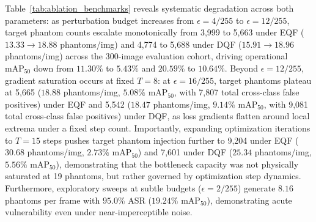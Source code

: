 \documentclass[preprint,12pt]{elsarticle}
\begin{document}
Table~\ref{tab:ablation_benchmarks} reveals systematic degradation across both parameters: as perturbation budget increases from $\epsilon=4/255$ to $\epsilon=12/255$, target phantom counts escalate monotonically from 3,999 to 5,663 under EQF ($13.33 \to 18.88$ phantoms/img) and 4,774 to 5,688 under DQF ($15.91 \to 18.96$ phantoms/img) across the 300-image evaluation cohort, driving operational $\mathrm{mAP}_{50}$ down from $11.30\%$ to $5.43\%$ and $20.59\%$ to $10.64\%$. Beyond $\epsilon=12/255$, gradient saturation occurs at fixed $T=8$: at $\epsilon=16/255$, target phantoms plateau at 5,665 ($18.88$ phantoms/img, $5.08\%$ $\mathrm{mAP}_{50}$, with 7,807 total cross-class false positives) under EQF and 5,542 ($18.47$ phantoms/img, $9.14\%$ $\mathrm{mAP}_{50}$, with 9,081 total cross-class false positives) under DQF, as loss gradients flatten around local extrema under a fixed step count. Importantly, expanding optimization iterations to $T=15$ steps pushes target phantom injection further to 9,204 under EQF ($30.68$ phantoms/img, $2.73\%$ $\mathrm{mAP}_{50}$) and 7,601 under DQF ($25.34$ phantoms/img, $5.56\%$ $\mathrm{mAP}_{50}$), demonstrating that the bottleneck capacity was not physically saturated at 19 phantoms, but rather governed by optimization step dynamics. Furthermore, exploratory sweeps at subtle budgets ($\epsilon=2/255$) generate $8.16$ phantoms per frame with $95.0\%$ ASR ($19.24\%$ $\mathrm{mAP}_{50}$), demonstrating acute vulnerability even under near-imperceptible noise.
\end{document}
